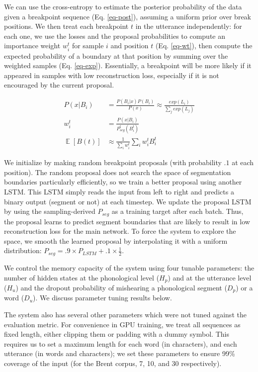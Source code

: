 \documentclass[11pt,letterpaper]{article}
\DeclareMathOperator*{\Exp}{\mathbb{E}}
\begin{document}
We can use the cross-entropy to estimate the posterior probability of
the data given a breakpoint sequence (Eq. \ref{eq-post}), assuming a
uniform prior over break positions. We then treat each breakpoint $t$
in the utterance independently: for each one, we use the losses and
the proposal probabilities to compute an importance weight $w_i^t$ for
sample $i$ and position $t$ (Eq. \ref{eq-wt}), then compute the
expected probability of a boundary at that position by summing over
the weighted samples (Eq. \ref{eq-exp}).  Essentially, a breakpoint
will be more likely if it appeared in samples with low reconstruction
loss, especially if it is not encouraged by the current proposal.

\begin{align}
P(x|B_i) &= \frac{P(B_i|x)P(B_i)}{P(x)} \approx \frac{exp(L_i)}{\sum_j
  exp(L_j)}
\label{eq-post}\\
w_i^t &= \frac{P(x|B_i)}{P_{seg}^t(B_i^t)}
\label{eq-wt}\\
\Exp[B(t)] &\approx \frac{1}{\sum_i w_i^t} \sum_i w_i^t B_i^t
\label{eq-exp}
\end{align}

We initialize by making random breakpoint proposals (with probability
$.1$ at each position). The random proposal does not search the space
of segmentation boundaries particularly efficiently, so we train a
better proposal using another LSTM. This LSTM simply reads the input
from left to right and predicts a binary output (segment or not) at
each timestep. We update the proposal LSTM by using the
sampling-derived $P_{seg}$ as a training target after each
batch. Thus, the proposal learns to predict segment boundaries that
are likely to result in low reconstruction loss for the main
network. To force the system to explore the space, we smooth the
learned proposal by interpolating it with a uniform distribution:
$P_{seg} = .9 \times P_{LSTM} + .1 \times \frac{1}{2}$.

We control the memory capacity of the system using four tunable
parameters: the number of hidden states at the phonological level
($H_p$) and at the utterance level ($H_u$) and the dropout probability
of mishearing a phonological segment ($D_p$) or a word ($D_u$). We
discuss parameter tuning results below.

The system also has several other parameters which were not tuned
against the evaluation metric. For convenience in GPU training, we
treat all sequences as fixed length, either clipping them or padding
with a dummy symbol. This requires us to set a maximum length for each
word (in characters), and each utterance (in words and characters); we
set these parameters to ensure 99\% coverage of the input (for the
Brent corpus, 7, 10, and 30 respectively).
\end{document}
